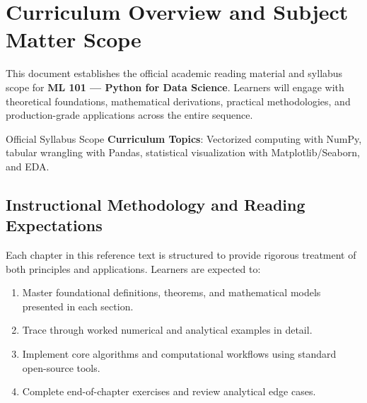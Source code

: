 \section{Curriculum Overview and Subject Matter Scope}

This document establishes the official academic reading material and syllabus scope for \textbf{ML 101 --- Python for Data Science}. Learners will engage with theoretical foundations, mathematical derivations, practical methodologies, and production-grade applications across the entire sequence.

\begin{InsightBox}{Official Syllabus Scope}
  \textbf{Curriculum Topics}: Vectorized computing with NumPy, tabular wrangling with Pandas, statistical visualization with Matplotlib/Seaborn, and EDA.
\end{InsightBox}

\subsection{Instructional Methodology and Reading Expectations}

Each chapter in this reference text is structured to provide rigorous treatment of both principles and applications. Learners are expected to:
\begin{enumerate}
  \item Master foundational definitions, theorems, and mathematical models presented in each section.
  \item Trace through worked numerical and analytical examples in detail.
  \item Implement core algorithms and computational workflows using standard open-source tools.
  \item Complete end-of-chapter exercises and review analytical edge cases.
\end{enumerate}

